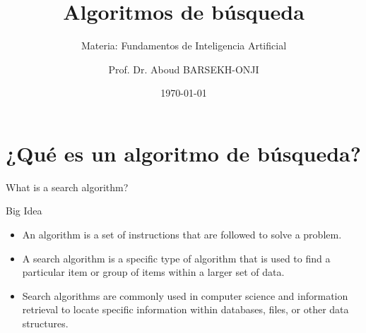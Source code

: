 \documentclass[aspectratio=169,xcolor=dvipsnames]{beamer}
\title{Algoritmos de búsqueda}
\subtitle{Materia: Fundamentos de Inteligencia Artificial}
\author{Prof. Dr. Aboud BARSEKH-ONJI}
\institute
{
    Facultad de Ingeniería \\
    Universidad Anáhuac México %
}
\date{\today} %
\begin{document}
\begin{frame}
    \titlepage
\end{frame}

\section{¿Qué es un algoritmo de búsqueda?}
\begin{frame}{What is a search algorithm?}
    \begin{alertblock}{Big Idea}
       \begin{itemize}
        \item An algorithm is a set of instructions that are followed to solve a problem.
        \item A search algorithm is a specific type of algorithm that is used to find a particular item or group of items within a larger set of data.
        \item Search algorithms are commonly used in computer science and information retrieval to locate specific information within databases, files, or other data structures.
    \end{itemize} 
    \end{alertblock}
    
    \end{frame}
\end{document}

